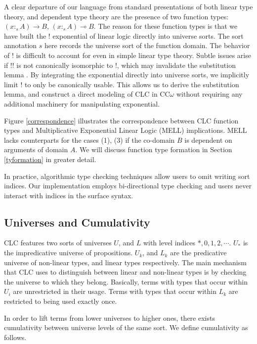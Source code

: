 \documentclass[sigplan,screen,review,authordraft]{acmart}
\theoremstyle{definition}
\begin{document}
  A clear departure of our language from standard presentations of both linear type theory, and dependent type theory are the presence of two function types: $(x :_s A) \rightarrow B$, $(x :_s A) \multimap B$. The reason for these function types is that we have built the ! exponential of linear logic directly into universe sorts. The sort annotation $s$ here records the universe sort of the function domain. The behavior of ! is difficult to account for even in simple linear type theory. Subtle issues arise if !! is not canonically isomorphic to !, which may invalidate the substitution lemma \cite{substitute}. By integrating the exponential directly into universe sorts, we implicitly limit ! to only be canonically usable. This allows us to derive the substitution lemma, and construct a direct modeling of CLC in CC$\omega$ without requiring any additional machinery for manipulating exponential.

  Figure \ref{correspondence} illustrates the correspondence between CLC function types and Multiplicative Exponential Linear Logic (MELL) implications. MELL lacks counterparts for the cases (1), (3) if the co-domain $B$ is dependent on arguments of domain $A$. We will discuss function type formation in Section \ref{tyformation} in greater detail.

  In practice, algorithmic type checking techniques allow users to omit writing sort indices. Our implementation employs bi-directional type checking and users never interact with indices in the surface syntax.

  \subsection{Universes and Cumulativity}
  CLC features two sorts of universes $U$, and $L$ with level indices $*, 0, 1, 2, \cdots$. $U_*$ is the impredicative universe of propositions. $U_k$, and $L_k$ are the predicative universe of non-linear types, and linear types respectively. The main mechanism that CLC uses to distinguish between linear and non-linear types is by checking the universe to which they belong. Basically, terms with types that occur within $U_i$ are unrestricted in their usage. Terms with types that occur within $L_k$ are restricted to being used exactly once.

  In order to lift terms from lower universes to higher ones, there exists cumulativity between universe levels of the same sort. We define cumulativity as follows.
\end{document}
